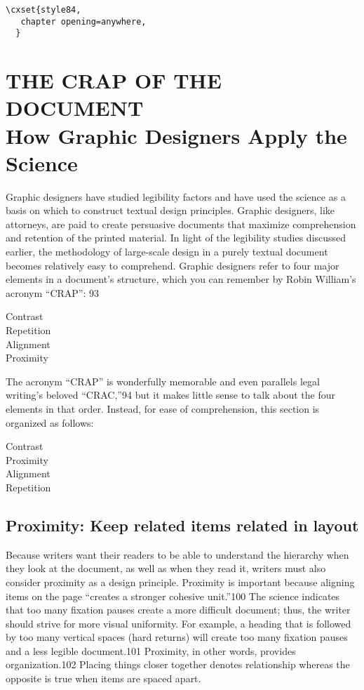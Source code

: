 
\example
\begin{verbatim}
\cxset{style84,
   chapter opening=anywhere,
  }
\end{verbatim}


 
\chapter{THE CRAP OF THE DOCUMENT\\ {\LARGE How Graphic Designers Apply the Science }}    
  
Graphic designers have studied legibility factors and have used the science as
a basis on which to construct textual design principles. Graphic designers, like
attorneys, are paid to create persuasive documents that maximize
comprehension and retention of the printed material. In light of the legibility
studies discussed earlier, the methodology of large-scale design in a purely
textual document becomes relatively easy to comprehend. Graphic designers
refer to four major elements in a document’s structure, which you can
remember by Robin William’s acronym “CRAP”: 93

 \noindent Contrast\\
 Repetition\\
 Alignment\\
 Proximity
 
The acronym “CRAP” is wonderfully memorable and even parallels legal
writing’s beloved “CRAC,”94 but it makes little sense to talk about the four
elements in that order. Instead, for ease of comprehension, this section is
organized as follows:

 Contrast\\
 Proximity\\
 Alignment\\
 Repetition
 
\section{Proximity: Keep related items related in layout}
 
Because writers want their readers to be able to understand the hierarchy
when they look at the document, as well as when they read it, writers must also
consider proximity as a design principle. Proximity is important because
aligning items on the page “creates a stronger cohesive unit.”100 The science
indicates that too many fixation pauses create a more difficult document; thus,
the writer should strive for more visual uniformity. For example, a heading
that is followed by too many vertical spaces (hard returns) will create too
many fixation pauses and a less legible document.101
 Proximity, in other words, provides organization.102 Placing things closer
together denotes relationship whereas the opposite is true when items are
spaced apart. 


